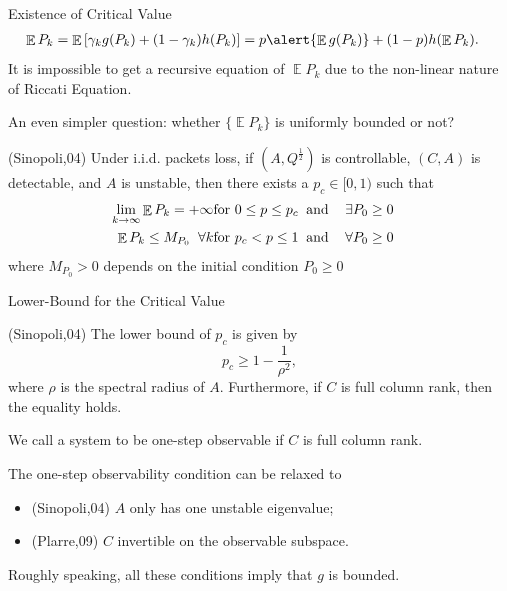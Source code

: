 \documentclass[10pt]{beamer}
\DeclareMathOperator{\1}{\textbf{1}}
\DeclareMathOperator{\E}{\mathbb E}
\begin{document}
\begin{frame}{Existence of Critical Value}
  \begin{displaymath}
    \begin{split}
      \E P_k &= \E\left[\gamma_k g(P_k) + (1-\gamma_k) h(P_k)\right]= p\alert{\E g(P_k)} + (1-p) h(\E P_k).
    \end{split}
  \end{displaymath}
  It is impossible to get a recursive equation of $\E P_k$ due to the non-linear nature of Riccati Equation. 

  An even simpler question: whether $\{\E P_k\}$ is uniformly bounded or not?
  \begin{theorem}
    (Sinopoli,04) Under i.i.d. packets loss, if $(A,Q^{\frac{1}{2}})$ is controllable, $(C,A)$ is detectable, and $A$ is unstable, then there exists a $p_c\in[0,1)$ such that
    \begin{eqnarray}\label{eqn:lambdaCrit}
      \lim_{k\rightarrow\infty}\E P_k=+\infty & \mbox{for } 0\leq
      p \leq p_c \; \;
      \mbox{and  \hspace{3mm}$\exists P_0 \geq 0$}&\\
      \E P_k \leq M_{P_0} \;\; \forall k & \mbox{for } p_c <
      p \leq 1 \; \; \mbox{and \hspace{3mm}$\forall P_0 \geq 0$}&
    \end{eqnarray}
    where $M_{P_0} > 0 $  depends on the initial condition $P_0 \geq 0$
  \end{theorem}
\end{frame}

\begin{frame}{Lower-Bound for the Critical Value}
  \begin{theorem}
    (Sinopoli,04) The lower bound of $p_c$ is given by
    \begin{displaymath}
      p_c \geq 1-\frac{1}{\rho^2}, 
    \end{displaymath}
    where $\rho$ is the spectral radius of $A$. Furthermore, if $C$ is full column rank, then the equality holds.
  \end{theorem}
  We call a system to be one-step observable if $C$ is full column rank.

  The one-step observability condition can be relaxed to
  \begin{itemize}
    \item (Sinopoli,04) $A$ only has one unstable eigenvalue;
    \item (Plarre,09) $C$ invertible on the observable subspace.
  \end{itemize}
  Roughly speaking, all these conditions imply that $g$ is bounded.
\end{frame}
\end{document}
